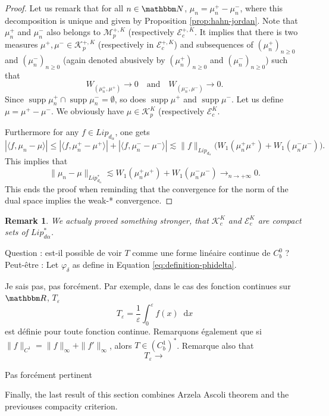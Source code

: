 \documentclass[a4paper,11pt, reqno]{amsart}
\newcommand{\cE}{\mathcal{E}}	\newcommand{\EE}{\mathbbm{E}}
\newcommand{\cK}{\mathcal{K}}	\newcommand{\KK}{\mathbbm{K}}
\newcommand{\cM}{\mathcal{M}}	\newcommand{\MM}{\mathbbm{M}}
\newcommand{\eps}{\varepsilon}
\newcommand{\dd}{\mathop{}\!\mathrm{d}}
\newcommand{\red}[1]{{\color{red} #1}}
\newcommand{\1}{\mathbbm{1}}
\theoremstyle{plain}
\newtheorem{remark}[theorem]{Remark}
\theoremstyle{definition}
\begin{document}
\begin{proof}
    Let us remark that for all $n\in \NN$, $\mu_n = \mu_n^+ - \mu_n^-$, where this decomposition is unique and given by Proposition \ref{prop:hahn-jordan}.
    Note that $\mu_n^+$ and $\mu_n^-$ also belongs to $\cM^{+,K}_{p}$ (respectively $\cE^{+,K}_{c}$. It implies that there is two measures $\mu^+,\mu^- \in \cK^{+,K}_p$ (respectively in $\cE^{+,K}_c$) and subsequences of $(\mu_n^+)_{n\ge 0}$ and $(\mu_n^-)_{n\ge 0}$ (again denoted abusively by $(\mu_n^+)_{n\ge 0}$ and $(\mu_n^-)_{n\ge 0}$) such that 
    \[W_(\mu^+_n,\mu^+) \to 0 \quad \text{and} \quad W_(\mu^-_n,\mu^-)\to 0.\]
    Since $\mathop{supp} \mu_n^+\cap \mathop{supp} \mu^-_n = \emptyset$, so does $\mathop{supp}\mu^+$ and $\mathop{supp}\mu^-$. Let us define $\mu= \mu^+ - \mu^-$. We obviously have $\mu \in \cK^K_p$ (respectively $\cE^K_c$.
    
    Furthermore for any $f\in Lip_{d_\alpha}$, one gets 
    \begin{equation*}
        |\langle f, \mu_n - \mu \rangle | \le |\langle f, \mu_n^+ - \mu^+ \rangle |+|\langle f, \mu_n^- - \mu^- \rangle | 
         \lesssim \|f\|_{Lip_{d_\alpha}} \big( W_1(\mu_n^+\mu^+)+ W_1(\mu_n^-\mu^-) \big).
    \end{equation*}
    This implies that 
    \[\|\mu_n - \mu\|_{Lip^*_{d_\alpha}} \lesssim W_1(\mu_n^+\mu^+)+ W_1(\mu_n^-\mu^-) \to_{n\to +\infty} 0. \]
    This ends the proof when reminding that the convergence for the norm of the dual space implies the weak-* convergence. 
\end{proof}

\begin{remark}
    We actualy proved something stronger, that $\cK^K_c$ and $\cE^K_c$ are compact sets of $Lip_{d\alpha}^*$.
\end{remark}

\red{Question : est-il possible de voir $T$ comme une forme linéaire continue de $C^0_b$ ? Peut-être  : 
Let $\varphi_\delta$ as define in Equation \eqref{eq:definition-phidelta}. 

 Je sais pas, pas forcément. Par exemple, dans le cas des fonction continues sur $\RR$, $T_\eps$ 
 \[T_\eps = \frac1\eps \int_0^\eps f(x) \dd x\]
 est définie pour toute fonction continue. Remarquons également que si $\|f\|_{C^1} = \|f\|_{\infty}+\|f'\|_{\infty}$, alors $T \in (C^1_b)^*$. Remarque also that  
 \[T_\eps \to \]
}

{\color{blue} Pas forcément pertinent}

Finally, the last result of this section combines Arzela Ascoli theorem and the previouses compacity criterion.
\end{document}
